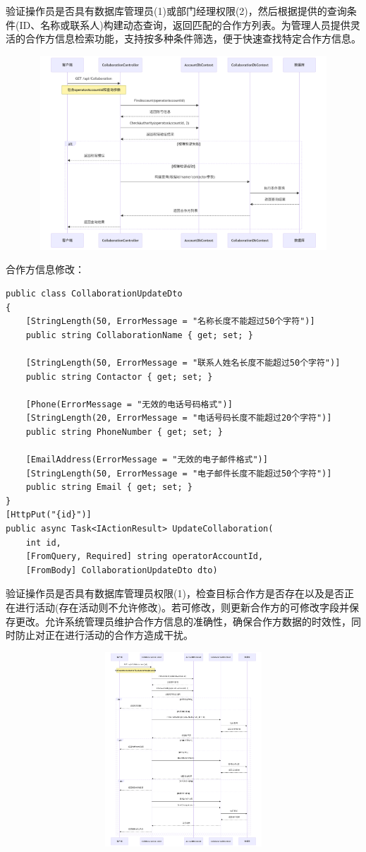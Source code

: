 \documentclass[]{article}
\begin{document}
验证操作员是否具有数据库管理员(1)或部门经理权限(2)，然后根据提供的查询条件(ID、名称或联系人)构建动态查询，返回匹配的合作方列表。为管理人员提供灵活的合作方信息检索功能，支持按多种条件筛选，便于快速查找特定合作方信息。

\includegraphics[width=5.64167in,height=2.86458in]{media/media/image_2-4-6.png}

合作方信息修改：

\begin{verbatim}
public class CollaborationUpdateDto
{
    [StringLength(50, ErrorMessage = "名称长度不能超过50个字符")]
    public string CollaborationName { get; set; }

    [StringLength(50, ErrorMessage = "联系人姓名长度不能超过50个字符")]
    public string Contactor { get; set; }

    [Phone(ErrorMessage = "无效的电话号码格式")]
    [StringLength(20, ErrorMessage = "电话号码长度不能超过20个字符")]
    public string PhoneNumber { get; set; }

    [EmailAddress(ErrorMessage = "无效的电子邮件格式")]
    [StringLength(50, ErrorMessage = "电子邮件长度不能超过50个字符")]
    public string Email { get; set; }
}
[HttpPut("{id}")]
public async Task<IActionResult> UpdateCollaboration(
    int id, 
    [FromQuery, Required] string operatorAccountId,
    [FromBody] CollaborationUpdateDto dto)
\end{verbatim}

验证操作员是否具有数据库管理员权限(1)，检查目标合作方是否存在以及是否正在进行活动(存在活动则不允许修改)。若可修改，则更新合作方的可修改字段并保存更改。允许系统管理员维护合作方信息的准确性，确保合作方数据的时效性，同时防止对正在进行活动的合作方造成干扰。

\includegraphics[width=5.64167in,height=2.86458in]{media/media/image_2-4-7.png}
\end{document}
